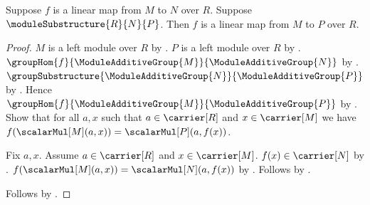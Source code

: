 \begin{theorem}\label{linear_map_codomain_enlargement}
    Suppose $f$ is a linear map from $M$ to $N$ over $R$.
    Suppose $\moduleSubstructure{R}{N}{P}$.
    Then $f$ is a linear map from $M$ to $P$ over $R$.
\end{theorem}
\begin{proof}
    $M$ is a left module over $R$ by
        .
    $P$ is a left module over $R$ by
        .
    $\groupHom{f}{\ModuleAdditiveGroup{M}}{
        \ModuleAdditiveGroup{N}}$ by
        .
    $\groupSubstructure{\ModuleAdditiveGroup{N}}{
        \ModuleAdditiveGroup{P}}$ by
        .
    Hence $\groupHom{f}{\ModuleAdditiveGroup{M}}{
        \ModuleAdditiveGroup{P}}$ by
        .
    Show that for all $a,x$ such that $a\in\carrier[R]$ and
        $x\in\carrier[M]$ we have
        $f(\scalarMul[M](a,x))=\scalarMul[P](a,f(x))$.
    \begin{subproof}
        Fix $a,x$.
        Assume $a\in\carrier[R]$ and $x\in\carrier[M]$.
        $f(x)\in\carrier[N]$ by .
        $f(\scalarMul[M](a,x))=\scalarMul[N](a,f(x))$ by
            .
        Follows by .
    \end{subproof}
    Follows by .
\end{proof}

